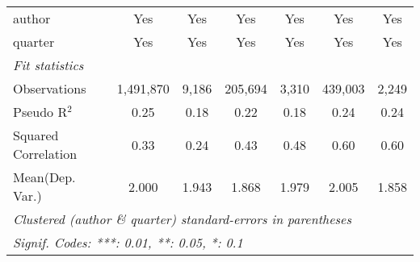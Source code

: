 \begin{tabular}{lcccccc}
   author                                                     & Yes           & Yes          & Yes           & Yes          & Yes           & Yes\\  
   quarter                                                    & Yes           & Yes          & Yes           & Yes          & Yes           & Yes\\  
   \midrule
   \emph{Fit statistics}\\
   Observations                                               & 1,491,870     & 9,186        & 205,694       & 3,310        & 439,003       & 2,249\\  
   Pseudo R$^2$                                               & 0.25          & 0.18         & 0.22          & 0.18         & 0.24          & 0.24\\  
   Squared Correlation                                        & 0.33          & 0.24         & 0.43          & 0.48         & 0.60          & 0.60\\  
Mean(Dep. Var.) & 2.000 & 1.943 & 1.868 & 1.979 & 2.005 & 1.858 \\
   \midrule \midrule
   \multicolumn{7}{l}{\emph{Clustered (author \& quarter) standard-errors in parentheses}}\\
   \multicolumn{7}{l}{\emph{Signif. Codes: ***: 0.01, **: 0.05, *: 0.1}}\\
\end{tabular}
\par\endgroup
